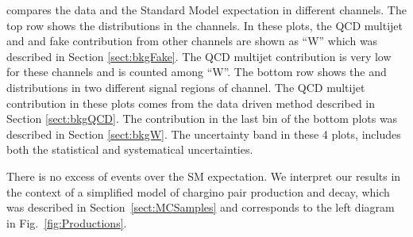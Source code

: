 compares the data and the Standard Model expectation in different channels. The top row 
shows the \mttwo distributions in the \leptonTau channels. 
In these plots, the QCD multijet and \wjets and fake contribution from other channels are shown 
as ``W'' which was described in Section \ref{sect:bkgFake}. The QCD multijet contribution is very low for these channels and is counted among ``W''.
The bottom row shows the \mttwo and \SumMT distributions in two different signal regions of \tauTau channel. 
The QCD multijet contribution in these plots comes from the data driven method described in 
Section \ref{sect:bkgQCD}. The \wjets contribution in the last bin of the bottom plots was described in Section \ref{sect:bkgW}. 
The uncertainty band in these 4 plots, includes both the statistical and systematical uncertainties.

There is no excess of events over the SM expectation.  We interpret our results in the context
of a simplified model of chargino pair production and decay, which was described in Section~\ref{sect:MCSamples} and corresponds 
to the left diagram in Fig.~\ref{fig:Productions}. 

